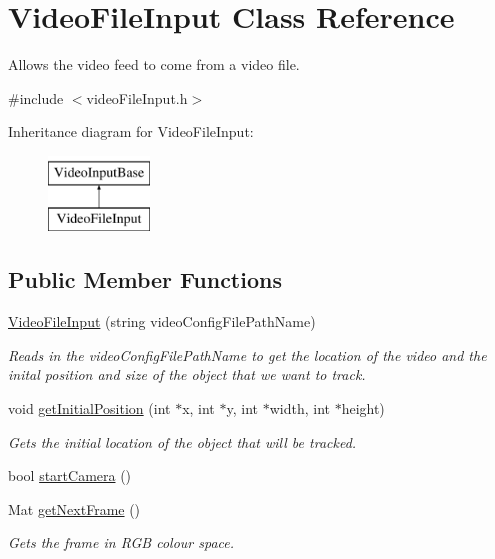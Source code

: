 \hypertarget{class_video_file_input}{}\section{Video\+File\+Input Class Reference}
\label{class_video_file_input}


Allows the video feed to come from a video file.  




{\ttfamily \#include $<$video\+File\+Input.\+h$>$}

Inheritance diagram for Video\+File\+Input\+:\begin{figure}[H]
\begin{center}
\leavevmode
\includegraphics[height=2.000000cm]{class_video_file_input}
\end{center}
\end{figure}
\subsection*{Public Member Functions}
\begin{DoxyCompactItemize}
\item 
\hyperlink{class_video_file_input_af95c920576786bb86b06bb25883747b6}{Video\+File\+Input} (string video\+Config\+File\+Path\+Name)
\begin{DoxyCompactList}\small\item\em Reads in the video\+Config\+File\+Path\+Name to get the location of the video and the inital position and size of the object that we want to track. \end{DoxyCompactList}\item 
void \hyperlink{class_video_file_input_ad2ad075776eed670dcf7e9e372d993cf}{get\+Initial\+Position} (int $\ast$x, int $\ast$y, int $\ast$width, int $\ast$height)
\begin{DoxyCompactList}\small\item\em Gets the initial location of the object that will be tracked. \end{DoxyCompactList}\item 
bool \hyperlink{class_video_file_input_a8d8cc050ab45a3b44403aa53d3d6e697}{start\+Camera} ()
\item 
Mat \hyperlink{class_video_file_input_a937889bfedcff9bd01d22fff70b71a61}{get\+Next\+Frame} ()
\begin{DoxyCompactList}\small\item\em Gets the frame in R\+G\+B colour space. \end{DoxyCompactList}\end{DoxyCompactItemize}
